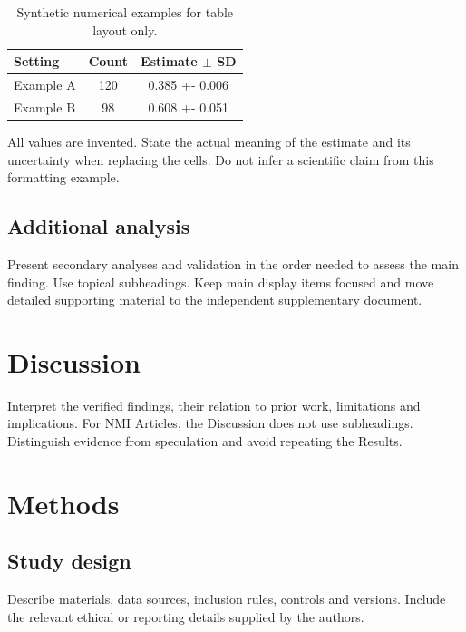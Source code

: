 \documentclass[11pt]{article}
\begin{document}
\begin{table}[htbp]
\centering
\caption{Synthetic numerical examples for table layout only.}
\label{tab:comparison}
\small
\begin{tabularx}{\linewidth}{@{}>{\raggedright\arraybackslash}X
  S[table-format=3.0] S[table-format=1.3(3)]@{}}
\toprule
Setting & {Count} & {Estimate $\pm$ SD}\\
\midrule
Example A & 120 & 0.385 +- 0.006\\
Example B & 98 & 0.608 +- 0.051\\
\bottomrule
\end{tabularx}
\par\smallskip\footnotesize\raggedright
All values are invented. State the actual meaning of the estimate and its
uncertainty when replacing the cells. Do not infer a scientific claim from
this formatting example.
\end{table}

\subsection{Additional analysis}
Present secondary analyses and validation in the order needed to assess the
main finding. Use topical subheadings. Keep main display items focused and
move detailed supporting material to the independent supplementary document.

\section{Discussion}\label{sec:discussion}
Interpret the verified findings, their relation to prior work, limitations
and implications. For NMI Articles, the Discussion does not use subheadings.
Distinguish evidence from speculation and avoid repeating the Results.

\section{Methods}\label{sec:methods}
\subsection{Study design}
Describe materials, data sources, inclusion rules, controls and versions.
Include the relevant ethical or reporting details supplied by the authors.
\end{document}
